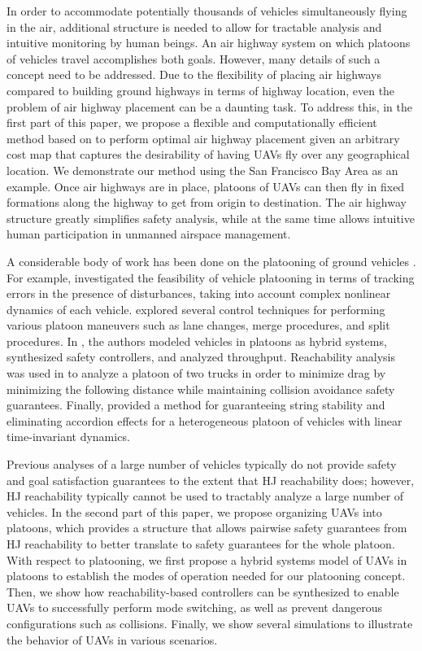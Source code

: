 In order to accommodate potentially thousands of vehicles simultaneously flying in the air, additional structure is needed to allow for tractable analysis and intuitive monitoring by human beings. An air highway system on which platoons of vehicles travel accomplishes both goals. However, many details of such a concept need to be addressed. Due to the flexibility of placing air highways compared to building ground highways in terms of highway location, even the problem of air highway placement can be a daunting task. To address this, in the first part of this paper, we propose a flexible and computationally efficient method based on \cite{Sethian96} to perform optimal air highway placement given an arbitrary cost map that captures the desirability of having UAVs fly over any geographical location. We demonstrate our method using the San Francisco Bay Area as an example. Once air highways are in place, platoons of UAVs can then fly in fixed formations along the highway to get from origin to destination. The air highway structure greatly simplifies safety analysis, while at the same time allows intuitive human participation in unmanned airspace management.

A considerable body of work has been done on the platooning of ground vehicles \cite{Kavathekar11}. For example, \cite{McMahon90} investigated the feasibility of vehicle platooning in terms of tracking errors in the presence of disturbances, taking into account complex nonlinear dynamics of each vehicle. \cite{Hedrick92} explored several control techniques for performing various platoon maneuvers such as lane changes, merge procedures, and split procedures. In \cite{Lygeros98}, the authors modeled vehicles in platoons as hybrid systems, synthesized safety controllers, and analyzed throughput. Reachability analysis was used in \cite{Alam11} to analyze a platoon of two trucks in order to minimize drag by minimizing the following distance while maintaining collision avoidance safety guarantees. Finally, \cite{Sabau16} provided a method for guaranteeing string stability and eliminating accordion effects for a heterogeneous platoon of vehicles with linear time-invariant dynamics.

Previous analyses of a large number of vehicles typically do not provide safety and goal satisfaction guarantees to the extent that HJ reachability does; however, HJ reachability typically cannot be used to tractably analyze a large number of vehicles. In the second part of this paper, we propose organizing UAVs into platoons, which provides a structure that allows pairwise safety guarantees from HJ reachability to better translate to safety guarantees for the whole platoon. With respect to platooning, we first propose a hybrid systems model of UAVs in platoons to establish the modes of operation needed for our platooning concept. Then, we show how reachability-based controllers can be synthesized to enable UAVs to successfully perform mode switching, as well as prevent dangerous configurations such as collisions. Finally, we show several simulations to illustrate the behavior of UAVs in various scenarios.

